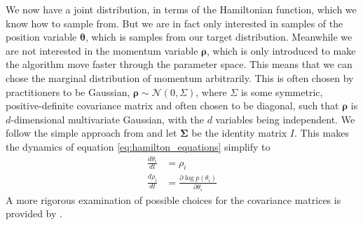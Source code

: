 We now have a joint distribution, in terms of the Hamiltonian function, which we know how to sample from. But we are in fact only interested in samples of the position variable $\boldsymbol{\theta}$, which is samples from our target distribution. Meanwhile we are not interested in the momentum variable $\boldsymbol{\rho}$, which is only introduced to make the algorithm move faster through the parameter space. This means that we can chose the marginal distribution of momentum arbitrarily. This is often chosen by practitioners to be Gaussian, $\boldsymbol{\rho}\sim \mathcal{N}\left(0, \Sigma \right)$, where $\Sigma$ is some symmetric, positive-definite covariance matrix and often chosen to be diagonal, such that $\boldsymbol{\rho}$ is $d$-dimensional multivariate Gaussian, with the $d$ variables being independent. We follow the simple approach from \cite{hoffman2011nouturn} and let $\mathbf{\Sigma}$ be the identity matrix $\mathit{I}$. This makes the dynamics of equation \ref{eq:hamilton_equations} simplify to 
\begin{equation*}
\begin{split}
\frac{d \theta_{i}}{d t}&=\rho_i \\
\frac{d \rho_{i}}{d t}&=\frac{\partial \log p(\theta_{i})}{\partial \theta_i} 
\end{split}
\end{equation*}
A more rigorous examination of possible choices for the covariance matrices is provided by \cite{neal2012mcmc}. 



